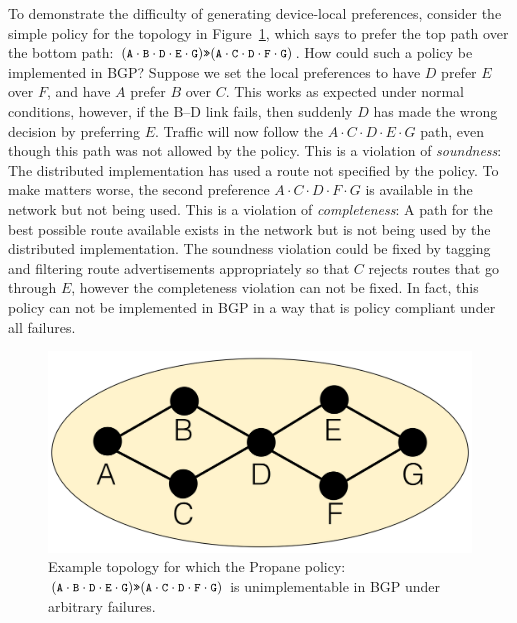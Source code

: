 \documentclass[10pt]{sigalternate052015}
\newcommand{\sysname}{{\small \sf Propane}\xspace}
\newcommand{\CD}[1]{\texttt{\small #1}}  %
\newcommand{\Prefer}{\texttt{>>}}
\begin{document}
To demonstrate the difficulty of generating device-local preferences, consider the simple policy for the topology in Figure~\ref{fig:unimplementable}, which says to prefer the top path over the bottom path:
%
$(\CD{A} \cdot \CD{B} \cdot \CD{D} \cdot \CD{E} \cdot \CD{G})  \Prefer (\CD{A} \cdot \CD{C} \cdot \CD{D} \cdot \CD{F} \cdot \CD{G})$.
%
How could such a policy be implemented in BGP? Suppose we set the local preferences to have $D$ prefer $E$ over $F$, and have $A$ prefer $B$ over $C$. This works as expected under normal conditions, however, if the B--D link fails, then suddenly $D$ has made the wrong decision by preferring $E$. Traffic will now follow the
$A \cdot C \cdot D \cdot E \cdot G$ path, even though this path was not allowed by the policy. This is a violation of \emph{soundness}: The distributed implementation has used a route not specified by the policy. To make matters worse, the second preference $A \cdot C \cdot D \cdot F \cdot G$ is available in the network but not being used. This is a violation of \emph{completeness}: A path for the best possible route available exists in the network but is not being used by the distributed implementation. 
%
The soundness violation could be fixed by tagging and filtering route advertisements appropriately so that $C$ rejects routes that go through $E$, however the completeness violation can not be fixed. In fact, this policy can not be implemented in BGP in a way that is policy compliant under all failures.

\begin{figure}[t!]
  \centering
  \includegraphics[width=.8\columnwidth]{figures/unimplementable}
  \caption{Example topology for which the \sysname policy: $(\CD{A} \cdot \CD{B} \cdot \CD{D} \cdot \CD{E} \cdot \CD{G}) \Prefer (\CD{A} \cdot \CD{C} \cdot \CD{D} \cdot \CD{F} \cdot \CD{G})$ is unimplementable in BGP under arbitrary failures.}
  \label{fig:unimplementable}
\end{figure}
\end{document}
